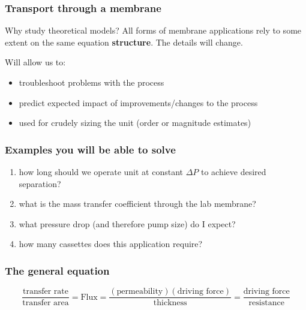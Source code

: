 \begin{frame}\frametitle{Transport through a membrane}
	\begin{exampleblock}{Why study theoretical models?}
		All forms of membrane applications rely to some extent on the same equation \textbf{structure}. The details will change.
	\end{exampleblock}

	\vspace{12pt}
	
	Will allow us to:
	\begin{itemize}
		\item	troubleshoot problems with the process
		\item	predict expected impact of improvements/changes to the process
		\item	used for crudely sizing the unit (order or magnitude estimates)
	\end{itemize}
	
\end{frame}

\begin{frame}\frametitle{Examples you will be able to solve}
	\begin{enumerate}
		\item	how long should we operate unit at constant \( \Delta P \) to achieve desired separation?
		\item	what is the mass transfer coefficient through the lab membrane?
		\item	what pressure drop (and therefore pump size) do I expect?
		\item	how many cassettes does this application require?
	\end{enumerate}
\end{frame}

\begin{frame}\frametitle{The general equation}
	\[
		\displaystyle \frac{\text{transfer rate}}{\text{transfer area}}  = \text{Flux} = \displaystyle \frac{(\text{permeability})(\text{driving force})}{\text{thickness}} = \displaystyle \frac{\text{driving force}}{\text{resistance}} 
	\]
\end{frame}

